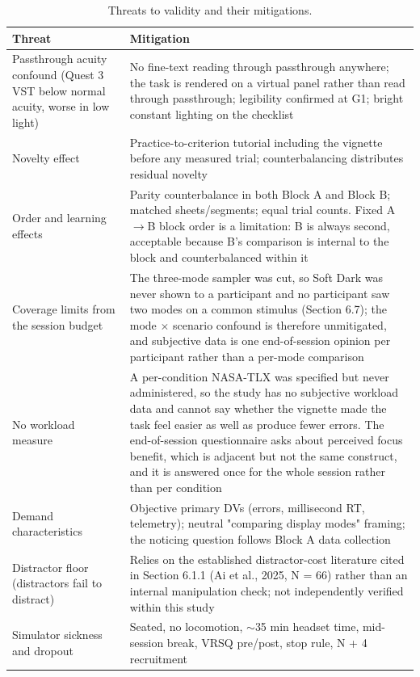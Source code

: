\begin{longtable}{p{}|p{}}
\caption{Threats to validity and their mitigations.}\\
\hline
\textbf{Threat} & \textbf{Mitigation} \\
\hline
\endhead
\hline
Passthrough acuity confound (Quest 3 VST below normal acuity, worse in low light) & No fine-text reading through passthrough anywhere; the task is rendered on a virtual panel rather than read through passthrough; legibility confirmed at G1; bright constant lighting on the checklist \\
Novelty effect & Practice-to-criterion tutorial including the vignette before any measured trial; counterbalancing distributes residual novelty \\
Order and learning effects & Parity counterbalance in both Block A and Block B; matched sheets/segments; equal trial counts. Fixed A$\rightarrow$B block order is a limitation: B is always second, acceptable because B's comparison is internal to the block and counterbalanced within it \\
Coverage limits from the session budget & The three-mode sampler was cut, so Soft Dark was never shown to a participant and no participant saw two modes on a common stimulus (Section 6.7); the mode $\times$ scenario confound is therefore unmitigated, and subjective data is one end-of-session opinion per participant rather than a per-mode comparison \\
No workload measure & A per-condition NASA-TLX was specified but never administered, so the study has no subjective workload data and cannot say whether the vignette made the task feel easier as well as produce fewer errors. The end-of-session questionnaire asks about perceived focus benefit, which is adjacent but not the same construct, and it is answered once for the whole session rather than per condition \\
Demand characteristics & Objective primary DVs (errors, millisecond RT, telemetry); neutral "comparing display modes" framing; the noticing question follows Block A data collection \\
Distractor floor (distractors fail to distract) & Relies on the established distractor-cost literature cited in Section 6.1.1 (Ai et al., 2025, N = 66) rather than an internal manipulation check; not independently verified within this study \\
Simulator sickness and dropout & Seated, no locomotion, $\sim$35 min headset time, mid-session break, VRSQ pre/post, stop rule, N + 4 recruitment \\

\end{longtable}
